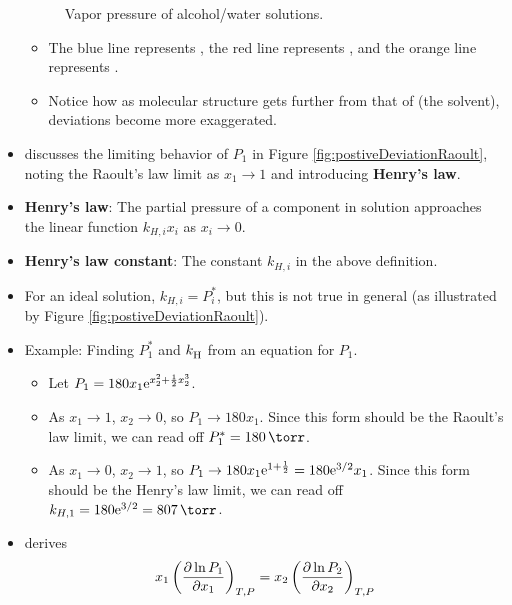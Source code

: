 \documentclass[../notes.tex]{subfiles}
\begin{document}
\begin{itemize}
\begin{figure}[H]
        \caption{Vapor pressure of alcohol/water solutions.}
        \label{fig:VPalcoholWater}
    \end{figure}
    \begin{itemize}
        \item The blue line represents , the red line represents , and the orange line represents .
        \item Notice how as molecular structure gets further from that of  (the solvent), deviations become more exaggerated.
    \end{itemize}
    \item \textcite{bib:McQuarrieSimon} discusses the limiting behavior of $P_1$ in Figure \ref{fig:postiveDeviationRaoult}, noting the Raoult's law limit as $x_1\to 1$ and introducing \textbf{Henry's law}.
    \item \textbf{Henry's law}: The partial pressure of a component in solution approaches the linear function $k_{H,i}x_i$ as $x_i\to 0$.
    \item \textbf{Henry's law constant}: The constant $k_{H,i}$ in the above definition.
    \item For an ideal solution, $k_{H,i}=P_i^*$, but this is not true in general (as illustrated by Figure \ref{fig:postiveDeviationRaoult}).
    \item Example: Finding $P_1^*$ and $\kH$ from an equation for $P_1$.
    \begin{itemize}
        \item Let $P_1=180x_1\e[x_2^2+\frac{1}{2}x_2^3]$.
        \item As $x_1\to 1$, $x_2\to 0$, so $P_1\to 180x_1$. Since this form should be the Raoult's law limit, we can read off $P_1^*=\SI{180}{\torr}$.
        \item As $x_1\to 0$, $x_2\to 1$, so $P_1\to 180x_1\e[1+\frac{1}{2}]=180\e[3/2]x_1$. Since this form should be the Henry's law limit, we can read off $k_{H,1}=180\e[3/2]=\SI{807}{\torr}$.
    \end{itemize}
    \item \textcite{bib:McQuarrieSimon} derives
    \begin{equation*}
        x_1\left( \pdv{\ln P_1}{x_1} \right)_{T,P} = x_2\left( \pdv{\ln P_2}{x_2} \right)_{T,P}
    \end{equation*}

\end{itemize}
\end{document}
